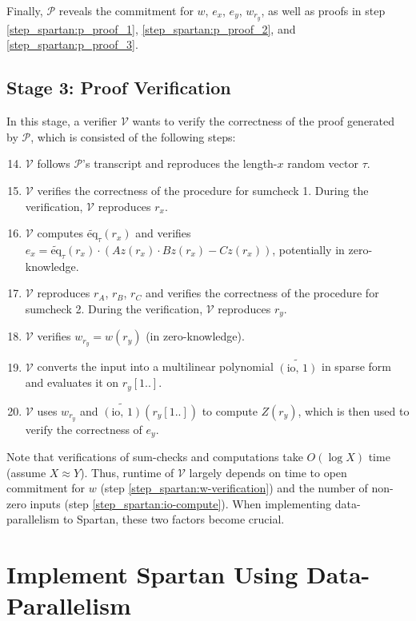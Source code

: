 \documentclass{article}
\renewcommand{\P}{\mathcal{P}}
\newcommand{\V}{\mathcal{V}}
\newcommand{\eq}{\widetilde{\mbox{eq}}}
\newcommand{\io}{\widetilde{(\mbox{io, 1})}}
\begin{document}
Finally, $\P$ reveals the commitment for $w$, $e_x$, $e_y$, $w_{r_y}$, as well as proofs in step \ref{step_spartan:p_proof_1}, \ref{step_spartan:p_proof_2}, and \ref{step_spartan:p_proof_3}.

\subsection{Stage 3: Proof Verification}
In this stage, a verifier $\V$ wants to verify the correctness of the proof generated by $\P$, which is consisted of the following steps:
\begin{enumerate}
    \setcounter{enumi}{13}
    \item $\V$ follows $\P$'s transcript and reproduces the length-$x$ random vector $\tau$.
    \item $\V$ verifies the correctness of the procedure for sumcheck 1. During the verification, $\V$ reproduces $r_x$.
    \item $\V$ computes $\eq_\tau(r_x)$ and verifies $e_x = \eq_\tau(r_x)\cdot (Az(r_x)\cdot Bz(r_x) - Cz(r_x))$, potentially in zero-knowledge.
    \item $\V$ reproduces $r_A$, $r_B$, $r_C$ and verifies the correctness of the procedure for sumcheck 2. During the verification, $\V$ reproduces $r_y$.
    \item $\V$ verifies $w_{r_y} = w(r_y)$ (in zero-knowledge).\label{step_spartan:w-verification}
    \item $\V$ converts the input into a multilinear polynomial $\io$ in sparse form and evaluates it on $r_y[1..]$.\label{step_spartan:io-compute}
    \item $\V$ uses $w_{r_y}$ and $\io(r_y[1..])$ to compute $Z(r_y)$, which is then used to verify the correctness of $e_y$.
\end{enumerate}

Note that verifications of sum-checks and computations take $O(\log X)$ time (assume $X\approx Y$). Thus, runtime of $\V$ largely depends on time to open commitment for $w$ (step \ref{step_spartan:w-verification}) and the number of non-zero inputs (step \ref{step_spartan:io-compute}). When implementing data-parallelism to Spartan, these two factors become crucial.


\section{Implement Spartan Using Data-Parallelism}\label{spartan_parallel}
\end{document}
